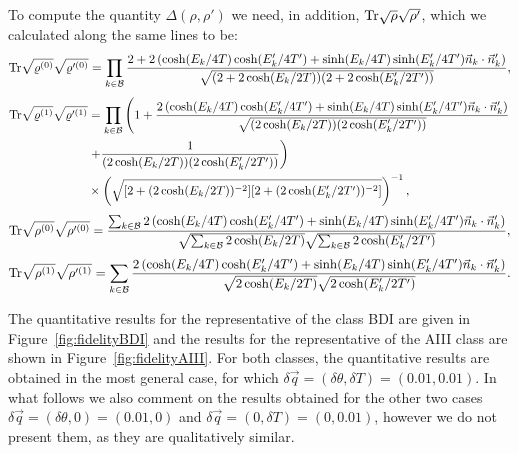 To compute the quantity $\Delta(\rho,\rho')$ we need, in addition, $\text{Tr} \sqrt{\rho}\sqrt{\rho'}$, which we calculated along the same lines to be: 
\begin{equation}
	\text{Tr} \sqrt{\varrho^{(0)}}\sqrt{\varrho'^{(0)}}=\prod_{k\in \mathcal{B}}\frac{2+2\left(\cosh(E_k/4T)\cosh(E'_k/4T')+\sinh(E_k/4T)\sinh(E'_k/4T')\vec{n}_k\cdot\vec{n}'_k\right)}{\sqrt{(2+ 2\cosh (E_k/2T))(2+2\cosh (E'_k/2T'))}},
\end{equation}
\vspace{\baselineskip}
\begin{eqnarray}
\text{Tr} \sqrt{\varrho^{(1)}}\sqrt{\varrho'^{(1)}}&=\prod_{k\in\mathcal{B}} \left(1+\frac{2\left(\cosh(E_k/4T)\cosh(E'_k/4T')+\sinh(E_k/4T)\sinh(E'_k/4T')\vec{n}_k\cdot\vec{n}'_k\right)}{\sqrt{(2\cosh (E_k/2T))(2\cosh (E'_k/2T'))}}\right.\nonumber \\
	&\left.+\frac{1}{(2\cosh (E_k/2T))(2\cosh (E'_k/2T'))}\right)\nonumber\\
	&\times\left(\sqrt{[2+ (2\cosh (E_k/2T))^{-2}][2+(2\cosh (E'_k/2T'))^{-2}]}\right)^{-1},
	\end{eqnarray}\vspace{\baselineskip}
\begin{equation}
	\text{Tr} \sqrt{\rho^{(0)}}\sqrt{\rho'^{(0)}}=\frac{\sum_{k\in\mathcal{B}}2\left(\cosh(E_k/4T)\cosh(E'_k/4T')+\sinh(E_k/4T)\sinh(E'_k/4T')\vec{n}_k\cdot\vec{n}'_k\right)}{\sqrt{\sum_{k\in\mathcal{B}} 2\cosh (E_k/2T)}\sqrt{\sum_{k\in\mathcal{B}}2\cosh (E'_{k}/2T')}},
\end{equation}
\vspace{\baselineskip}
\begin{equation}
\text{Tr} \sqrt{\rho^{(1)}}\sqrt{\rho'^{(1)}}=\sum_{k\in\mathcal{B}}\frac{2\left(\cosh(E_k/4T)\cosh(E'_k/4T')+\sinh(E_k/4T)\sinh(E'_k/4T')\vec{n}_k\cdot\vec{n}'_k\right)}{\sqrt{ 2\cosh (E_k/2T)}\sqrt{2\cosh (E'_{k}/2T')}}.
\end{equation}
\vspace{\baselineskip}

The quantitative results for the representative of the class BDI are given in Figure~\ref{fig:fidelityBDI} and the results for the representative of the AIII class are shown in Figure~\ref{fig:fidelityAIII}. For both classes, the quantitative results are obtained in the most general case, for which $\delta \vec{q}=(\delta\theta,\delta T)=(0.01,0.01).$ In what follows we also comment on the results obtained for the other two cases $\delta \vec{q}=(\delta\theta,0)=(0.01,0)$ and $\delta \vec{q}=(0,\delta T)=(0,0.01)$, however we do not present them, as they are qualitatively similar.


